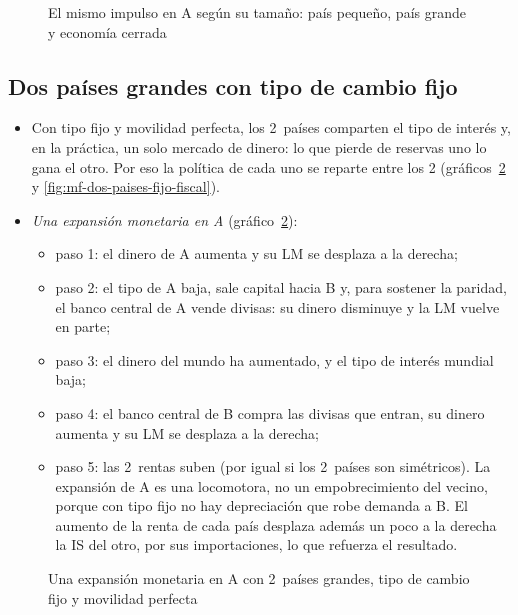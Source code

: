 \documentclass[11pt]{article}
\begin{document}
\begin{figure}[H]
\centering
\caption{El mismo impulso en A según su tamaño: país pequeño, país grande y economía cerrada}\label{fig:mf-tamano}
\end{figure}

\subsection*{Dos países grandes con tipo de cambio fijo}

\begin{itemize}
\item Con tipo fijo y movilidad perfecta, los 2~países comparten el tipo de interés y, en la práctica, un solo mercado de dinero: lo que pierde de reservas uno lo gana el otro. Por eso la política de cada uno se reparte entre los 2 (gráficos~\ref{fig:mf-dos-paises-fijo-monetaria} y \ref{fig:mf-dos-paises-fijo-fiscal}).
\item \emph{Una expansión monetaria en A} (gráfico~\ref{fig:mf-dos-paises-fijo-monetaria}):
  \begin{itemize}
  \item paso 1: el dinero de A aumenta y su LM se desplaza a la derecha;
  \item paso 2: el tipo de A baja, sale capital hacia B y, para sostener la paridad, el banco central de A vende divisas: su dinero disminuye y la LM vuelve en parte;
  \item paso 3: el dinero del mundo ha aumentado, y el tipo de interés mundial baja;
  \item paso 4: el banco central de B compra las divisas que entran, su dinero aumenta y su LM se desplaza a la derecha;
  \item paso 5: las 2~rentas suben (por igual si los 2~países son simétricos). La expansión de A es una locomotora, no un empobrecimiento del vecino, porque con tipo fijo no hay depreciación que robe demanda a B. El aumento de la renta de cada país desplaza además un poco a la derecha la IS del otro, por sus importaciones, lo que refuerza el resultado.
  \end{itemize}
\end{itemize}

\begin{figure}[H]
\centering
\caption{Una expansión monetaria en A con 2~países grandes, tipo de cambio fijo y movilidad perfecta}\label{fig:mf-dos-paises-fijo-monetaria}
\end{figure}
\end{document}

